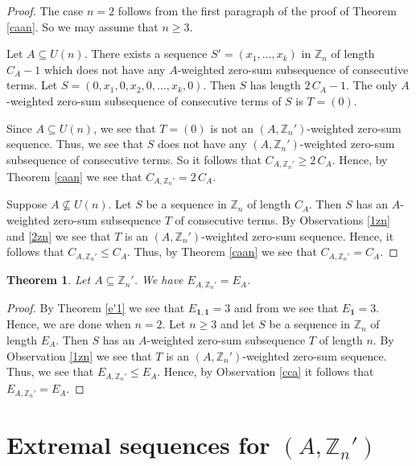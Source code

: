 \documentclass{article}[11pt]
\newtheorem{theorem}{Theorem}[section]
\theoremstyle{definition}
\begin{document}
\begin{proof}
The case $n=2$ follows from the first paragraph of the proof of Theorem \ref{caan}. So we may assume that $n\geq 3$.

Let $A\subseteq U(n)$. There exists a sequence $S'=(x_1,\ldots,x_k)$ in $\mathbb Z_n$ of length $C_A-1$ which does not have any $A$-weighted zero-sum subsequence of consecutive terms. Let $S=(0,x_1,0,x_2,0,\ldots,x_k,0)$. Then $S$ has length $2\,C_A-1$. The only $A$-weighted zero-sum subsequence of consecutive terms of $S$ is $T=(0)$.

Since $A\subseteq U(n)$, we see that $T=(0)$ is not an $(A,\mathbb Z_n')$-weighted zero-sum sequence. Thus, we see that $S$ does not have any $(A,\mathbb Z_n')$-weighted zero-sum subsequence of consecutive terms. So it follows that $C_{A,\mathbb Z_n'}\geq 2\,C_A$. Hence, by Theorem \ref{caan} we see that $C_{A,\mathbb Z_n'}=2\,C_A$.


Suppose $A\nsubseteq U(n)$. Let $S$ be a sequence in $\mathbb Z_n$ of length $C_A$. Then $S$ has an $A$-weighted zero-sum subsequence $T$ of consecutive terms. By Observations \ref{1zn} and \ref{2zn} we see that $T$ is an $(A,\mathbb Z_n')$-weighted zero-sum sequence. Hence, it follows that $C_{A,\mathbb Z_n'}\leq C_A$. Thus, by Theorem \ref{caan} we see that $C_{A,\mathbb Z_n'}=C_A$.
\end{proof}

\begin{theorem}\label{ean}
Let $A\subseteq \mathbb Z_n'$. We have $E_{A,\mathbb Z_n'}=E_A$.
\end{theorem}

\begin{proof}
By Theorem \ref{e'1} we see that $E_{\mathbf 1,\mathbf 1}=3$ and from \cite{EGZ} we see that $E_{\mathbf 1}=3$. Hence, we are done when $n=2$. Let $n\geq 3$ and let $S$ be a sequence in $\mathbb Z_n$ of length $E_A$. Then $S$ has an $A$-weighted zero-sum subsequence $T$ of length $n$. By Observation \ref{1zn} we see that $T$ is an $(A,\mathbb Z_n')$-weighted zero-sum sequence. Thus, we see that $E_{A,\mathbb Z_n'}\leq E_A$. Hence, by Observation \ref{cca} it follows that $E_{A,\mathbb Z_n'}=E_A$.
\end{proof}



\section{Extremal sequences for $(A,\mathbb Z_n')$}
\end{document}
